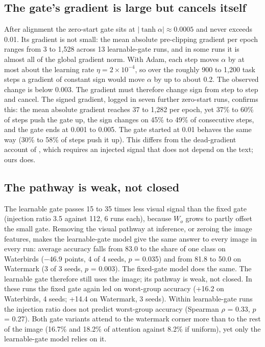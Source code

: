 \subsection{The gate's gradient is large but cancels itself}

After alignment the zero-start gate sits at \(|\tanh\alpha| \approx 0.0005\) and never exceeds 0.01. Its gradient is
not small: the mean absolute pre-clipping gradient per epoch ranges from 3 to 1,528 across 13 learnable-gate runs,
and in some runs it is almost all of the global gradient norm. With Adam, each step moves \(\alpha\) by at most about
the learning rate \(\eta = 2 \times 10^{-4}\), so over the roughly 900 to 1,200 task steps a gradient of constant sign
would move \(\alpha\) by up to about 0.2. The observed change is below 0.003. The gradient must therefore change sign
from step to step and cancel. The signed gradient, logged in seven further zero-start runs, confirms this: the mean
absolute gradient reaches 37 to 1,282 per epoch, yet 37\% to 60\% of steps push the gate up, the sign changes on 45\%
to 49\% of consecutive steps, and the gate ends at 0.001 to 0.005. The gate started at 0.01 behaves the same way
(30\% to 58\% of steps push it up). This differs from the dead-gradient account of \citep{farazi2026gate}, which requires an
injected signal that does not depend on the text; ours does.

\subsection{The pathway is weak, not closed}

The learnable gate passes 15 to 35 times less visual signal than the fixed gate (injection ratio 3.5 against 112,
6 runs each), because \(W_o\) grows to partly offset the small gate. Removing the visual pathway at inference, or
zeroing the image features, makes the learnable-gate model give the same answer to every image in every run:
average accuracy falls from 83.0 to the share of one class on Waterbirds (\(-46.9\) points, 4 of 4 seeds, \(p\) = 0.035)
and from 81.8 to 50.0 on Watermark (3 of 3 seeds, \(p\) = 0.003). The fixed-gate model does the same. The learnable
gate therefore still uses the image; its pathway is weak, not closed. In these runs the fixed gate again led on
worst-group accuracy (+16.2 on Waterbirds, 4 seeds; +14.4 on Watermark, 3 seeds). Within learnable-gate runs the injection ratio does not predict
worst-group accuracy (Spearman \(\rho\) = 0.33, \(p\) = 0.27). Both gate variants attend to the watermark corner more
than to the rest of the image (16.7\% and 18.2\% of attention against 8.2\% if uniform), yet only the learnable-gate
model relies on it.

